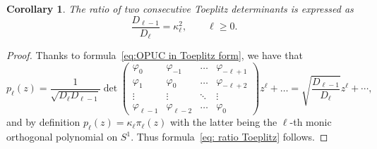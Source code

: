 \documentclass[pdftex]{sigma}%
\numberwithin{equation}{section}
\newtheorem{Corollary}[Theorem]{Corollary}
\begin{document}
	\begin{Corollary}
		The ratio of two consecutive Toeplitz determinants is expressed as
		\begin{equation}\label{eq: ratio Toeplitz}
			\frac{D_{\ell-1}}{D_{\ell}}=\kappa_\ell^2,\qquad
\ell \geq 0.
		\end{equation}
	\end{Corollary}
	\begin{proof}
		Thanks to formula~\eqref{eq:OPUC in Toeplitz form}, we have that
		\begin{equation*}
			p_\ell(z)= \frac{1}{\sqrt{D_\ell D_{\ell-1}}}\det\begin{pmatrix}
				\varphi_0 & \varphi_{-1} & \dots & \varphi_{-\ell+1}\\
				\varphi_1& \varphi_0 & \dots & \varphi_{-\ell+2} \\
				\vdots& \vdots & \ddots & \vdots \\
				\varphi_{\ell-1}& \varphi_{\ell-2}& \dots & \varphi_0
			\end{pmatrix}z^\ell+\dots =\sqrt{\frac{D_{\ell-1}}{D_\ell}}z^\ell+\cdots,
		\end{equation*}
		and by definition $p_\ell(z)= \kappa_\ell \pi_\ell(z)$ with the latter being the $\ell$-th monic orthogonal polynomial on $S^1$. Thus formula~\eqref{eq: ratio Toeplitz} follows.
	\end{proof}
	
\end{document}
